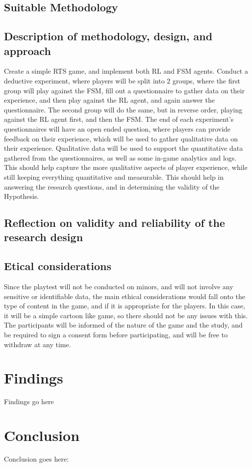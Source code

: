 \documentclass[conference]{IEEEtran}
\begin{document}
\subsection{Suitable Methodology}


\subsection{Description of methodology, design, and approach}

Create a simple RTS game, and implement both RL and FSM agents. Conduct a deductive experiment, where players will be split into 2 groups,
where the first group will play against the FSM, fill out a questionnaire to gather data on their experience, and then play against the RL agent,
and again answer the questionnaire. The second group will do the same, but in reverse order, playing against the RL agent first, and then the FSM.
The end of each experiment's questionnaires will have an open ended question, where players can provide feedback on their experience,
which will be used to gather qualitative data on their experience. Qualitative data will be used to support the quantitative data gathered from
the questionnaires, as well as some in-game analytics and logs. This should help capture the more qualitative aspects of player experience,
while still keeping everything quantitative and measurable. This should help in answering the research questions, and in determining the validity
of the Hypothesis.

\subsection{Reflection on validity and reliability of the research design}


\subsection{Etical considerations}

Since the playtest will not be conducted on minors, and will not involve any sensitive or identifiable data, the main ethical considerations
would fall onto the type of content in the game, and if it is appropriate for the players. In this case, it will be a simple cartoon like game,
so there should not be any issues with this. The participants will be informed of the nature of the game and the study, and be required to
sign a consent form before participating, and will be free to withdraw at any time.


\section{Findings}

Findings go here

\section{Conclusion}

Conclusion goes here:



\end{document}
